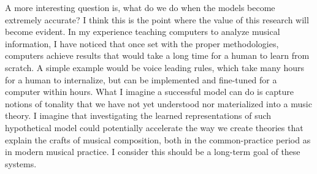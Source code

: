 

A more interesting question is, what do we do when the
models become extremely accurate? I think this is the point
where the value of this research will become evident. In my
experience teaching computers to analyze musical
information, I have noticed that once set with the proper
methodologies, computers achieve results that would take a
long time for a human to learn from scratch. A simple
example would be voice leading rules, which take many hours
for a human to internalize, but can be implemented and
fine-tuned for a computer within hours. What I imagine a
successful model can do is capture notions of tonality that
we have not yet understood nor materialized into a music
theory. I imagine that investigating the learned
representations of such hypothetical model could potentially
accelerate the way we create theories that explain the
crafts of musical composition, both in the common-practice
period as in modern musical practice. I consider this should
be a long-term goal of these systems.
